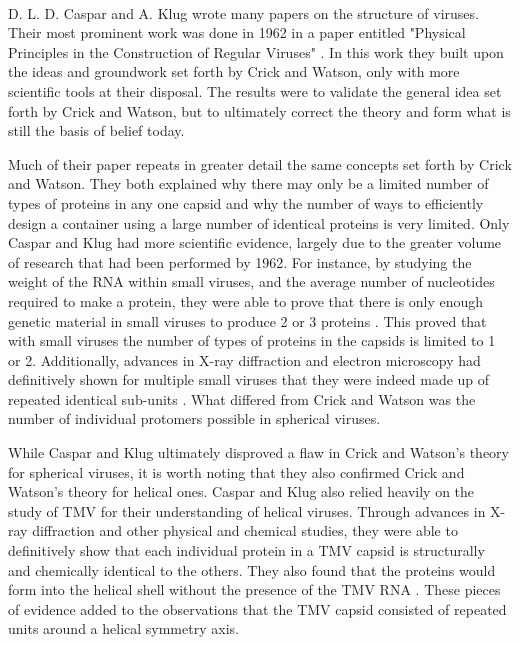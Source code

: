 \documentclass[12pt,letter]{article}
\begin{document}
\paragraph{}

D. L. D. Caspar and  A. Klug wrote many papers on the structure of viruses. Their most prominent work was done in 1962 in a paper entitled "Physical Principles in the Construction of Regular Viruses" \cite{Caspar:1962}. In this work they built upon the ideas and groundwork set forth by Crick and Watson, only with more scientific tools at their disposal. The results were to validate the general idea set forth by Crick and Watson, but to ultimately correct the theory and form what is still the basis of belief today.

Much of their paper repeats in greater detail the same concepts set forth by Crick and Watson. They both explained why there may only be a limited number of types of proteins in any one capsid and why the number of ways to efficiently design a container using a large number of identical proteins is very limited. Only Caspar and Klug had more scientific evidence, largely due to the greater volume of research that had been performed by 1962. For instance, by studying the weight of the RNA within small viruses, and the average number of nucleotides required to make a protein, they were able to prove that there is only enough genetic material in small viruses to produce 2 or 3 proteins \cite[p 1]{Caspar:1962}. This proved that with small viruses the number of types of proteins in the capsids is limited to 1 or 2. Additionally, advances in X-ray diffraction and electron microscopy had definitively shown for multiple small viruses that they were indeed made up of repeated  identical sub-units \cite[p 2]{Caspar:1962}. What differed from Crick and Watson was the number of individual protomers possible in spherical viruses.

While Caspar and Klug ultimately disproved a flaw in Crick and Watson's theory for spherical viruses, it is worth noting that they also confirmed Crick and Watson's theory for helical ones. Caspar and Klug also relied heavily on the study of TMV for their understanding of helical viruses. Through advances in X-ray diffraction and other physical and chemical studies, they were able to definitively show that each individual protein in a TMV capsid is structurally and chemically identical to the others. They also found that the proteins would form into the helical shell without the presence of the TMV RNA \cite[p 4-5]{Caspar:1962}. These pieces of evidence added to the observations that the TMV capsid consisted of repeated units around a helical symmetry axis.
\end{document}

